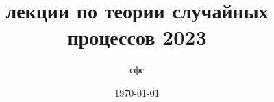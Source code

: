 \documentclass[a4paper,12pt]{article}
\theoremstyle{plain}
\begin{document}
\author{сфс}
\title{лекции по теории случайных процессов 2023}
\date{\today}
\maketitle
\large














\end{document}
